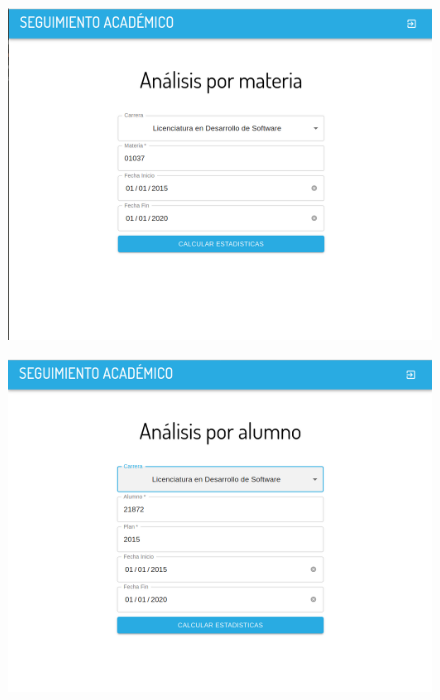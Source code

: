 \begin{figure}[!htbp]
  \centering
    \includegraphics[scale=0.3]{images/seguimiento-academico/sa-form-materia.png}
  \label{fig:sa-materia}
\end{figure}

\begin{figure}[!htbp]
  \centering
    \includegraphics[scale=0.3]{images/seguimiento-academico/sa-form-alumno.png}
  \label{fig:sa-alumno}
\end{figure}



